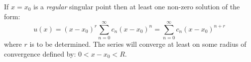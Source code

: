 \begin{theorem}
If $x=x_0$ is a \emph{regular} singular point then at least one non-zero solution of the form:
$$u(x) = (x-x_0)^r\sum\limits_{n=0}^{\infty}c_n(x-x_0)^n = \sum\limits_{n=0}^{\infty}c_n(x-x_0)^{n+r}$$
where $r$ is to be determined.  The series will converge at least on some radius of convergence defined by: $0<x-x_0<R$.
\end{theorem}

